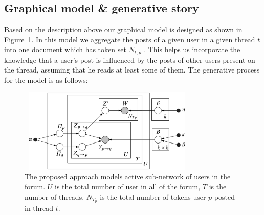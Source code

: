 \documentclass{sig-alternate}
\begin{document}
\subsection{Graphical model \& generative story}
\label{sec:gen-story}
Based on the description above our graphical model is designed as shown
in Figure~\ref{fig:finalThreadAggregationModel}. In this model
we aggregate the posts of 
a given user in a given thread $t$ into one document which has token
set $N_{t,p}$ . This helps us incorporate the knowledge that a user's post is
influenced by the posts of other users present on the thread, assuming that
he reads at least some of them.
The generative process for the model is as follows:
\begin{figure}
\centering
\includegraphics[height=4cm,width=8.5cm]{model.pdf}
\caption{\small{The proposed approach models active sub-network of users in the forum.
$U$ is the total number of user in all of the forum, $T$ is the number of
threads. $N_{T_p}$ is the total number of tokens user $p$ posted in thread $t$.
}}
\label{fig:finalThreadAggregationModel}
\end{figure}
\end{document}
